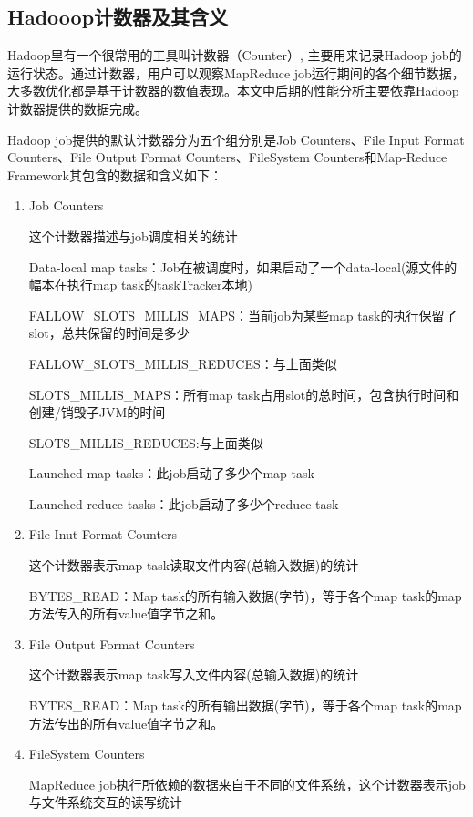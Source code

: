 \subsection{Hadooop计数器及其含义}
Hadoop里有一个很常用的工具叫计数器（Counter）, 主要用来记录Hadoop job的运行状态。通过计数器，用户可以观察MapReduce job运行期间的各个细节数据，大多数优化都是基于计数器的数值表现。本文中后期的性能分析主要依靠Hadoop计数器提供的数据完成。

Hadoop job提供的默认计数器分为五个组分别是Job Counters、File Input Format Counters、File Output Format Counters、FileSystem Counters和Map-Reduce Framework其包含的数据和含义如下：

\begin{enumerate}

\item Job Counters 

这个计数器描述与job调度相关的统计 

Data-local map tasks：Job在被调度时，如果启动了一个data-local(源文件的幅本在执行map task的taskTracker本地) 

FALLOW\_SLOTS\_MILLIS\_MAPS：当前job为某些map task的执行保留了slot，总共保留的时间是多少 

FALLOW\_SLOTS\_MILLIS\_REDUCES：与上面类似 

SLOTS\_MILLIS\_MAPS：所有map task占用slot的总时间，包含执行时间和创建/销毁子JVM的时间 

SLOTS\_MILLIS\_REDUCES:与上面类似 

Launched map tasks：此job启动了多少个map task 

Launched reduce tasks：此job启动了多少个reduce task 


\item File Inut Format Counters

这个计数器表示map task读取文件内容(总输入数据)的统计

BYTES\_READ：Map task的所有输入数据(字节)，等于各个map task的map方法传入的所有value值字节之和。 

\item File Output Format Counters

这个计数器表示map task写入文件内容(总输入数据)的统计

BYTES\_READ：Map task的所有输出数据(字节)，等于各个map task的map方法传出的所有value值字节之和。 

\item FileSystem Counters

MapReduce job执行所依赖的数据来自于不同的文件系统，这个计数器表示job与文件系统交互的读写统计 


\end{enumerate}
